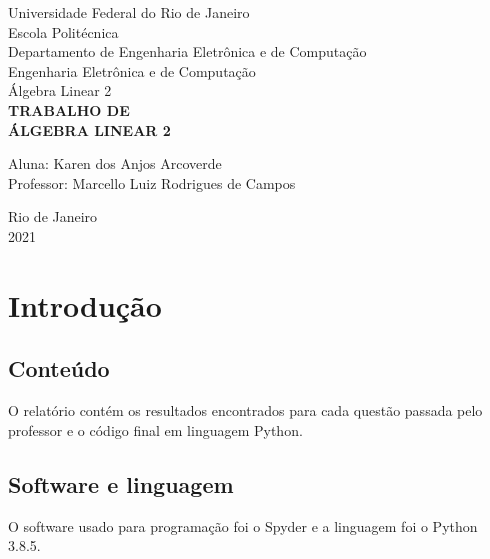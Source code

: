 \documentclass[a4paper,12pt,twoside]{article}
\date{}
\begin{document}
\begin{titlepage} %
\begin{center} %
{\large Universidade Federal do Rio de Janeiro}\\[0.2cm] %
{\large Escola Politécnica}\\[0.2cm] %
{\large Departamento de Engenharia Eletrônica e de Computação}\\[0.2cm]
{\large Engenharia Eletrônica e de Computação}\\[0.2cm]
{\large Álgebra Linear 2}\\[5.1cm]
{\bf \huge TRABALHO DE}\\ %
{\bf \huge ÁLGEBRA LINEAR 2}\\[5.1cm] 
\end{center} %
{\large Aluna: Karen dos Anjos Arcoverde}\\[0.7cm] %
{\large Professor: Marcello Luiz Rodrigues de Campos}\\[5.1cm]
\begin{center}
{\large Rio de Janeiro}\\[0.2cm]
{\large 2021}
\end{center}
\end{titlepage} %


\renewcommand{\contentsname}{Sumário}

\tableofcontents
\clearpage





\section{Introdução}
\subsection{Conteúdo}
    O relatório contém os resultados encontrados para cada questão passada pelo professor e o código final em linguagem Python.
\subsection{Software e linguagem}
    O software usado para programação foi o Spyder e a linguagem foi o Python 3.8.5.
\end{document}

